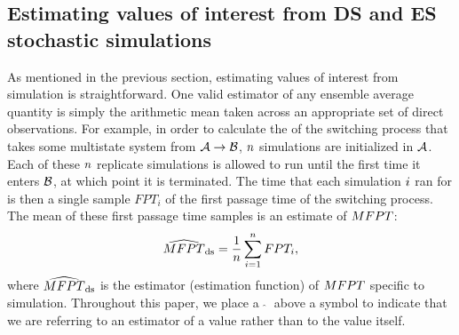 
\subsection{Estimating values of interest from DS and ES stochastic simulations}
As mentioned in the previous section, estimating values of interest from  simulation is straightforward. One valid estimator of any ensemble average quantity is simply the arithmetic mean taken across an appropriate set of direct observations. For example, in order to calculate the  of the switching process that takes some multistate system from $\mathcal{A} \rightarrow \mathcal{B}$, $n$  simulations are initialized in $\mathcal{A}$. Each of these $n$ replicate simulations is allowed to run until the first time it enters $\mathcal{B}$, at which point it is terminated. The time that each simulation $i$ ran for is then a single sample $FPT_i$ of the first passage time of the switching process. The mean of these first passage time samples is an estimate of $MFPT$\supercite{Gillespie:1981fo}:
    \begin{equation}
        \widehat{MFPT}_{\text{ds}} = \frac{1}{n} \sum^{n}_{i=1} FPT_i,
    \end{equation}
where $\widehat{MFPT}_{\text{ds}}$ is the estimator (\ie estimation function) of $MFPT$ specific to  simulation. Throughout this paper, we place a $\;\widehat{}\;$ above a symbol to indicate that we are referring to an estimator of a value rather than to the value itself.


